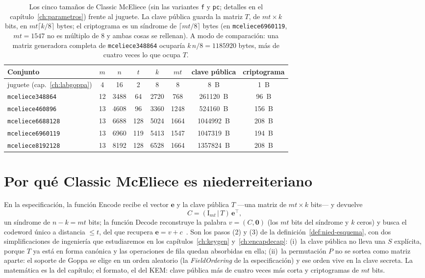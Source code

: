 \documentclass[11pt,a4paper,oneside]{report}
\newcommand{\ve}{\mathbf{e}}
\begin{document}
\begin{table}[htbp]
\centering
\small
\setlength{\tabcolsep}{5pt}
\begin{tabular}{lccccccc}
\toprule
Conjunto & $m$ & $n$ & $t$ & $k$ & $mt$ & clave pública & criptograma\\
\midrule
juguete (cap.~\ref{ch:labgoppa}) & 4 & 16 & 2 & 8 & 8 & 8~B & 1~B\\
\texttt{mceliece348864} & 12 & 3488 & 64 & 2720 & 768 & \num{261120}~B & 96~B\\
\texttt{mceliece460896} & 13 & 4608 & 96 & 3360 & 1248 & \num{524160}~B & 156~B\\
\texttt{mceliece6688128} & 13 & 6688 & 128 & 5024 & 1664 & \num{1044992}~B & 208~B\\
\texttt{mceliece6960119} & 13 & 6960 & 119 & 5413 & 1547 & \num{1047319}~B & 194~B\\
\texttt{mceliece8192128} & 13 & 8192 & 128 & 6528 & 1664 & \num{1357824}~B & 208~B\\
\bottomrule
\end{tabular}
\caption{Los cinco tamaños de Classic McEliece (sin las variantes
\texttt{f} y \texttt{pc}; detalles en el capítulo~\ref{ch:parametros})
frente al juguete. La clave pública guarda la matriz $T$, de
$mt\times k$ bits, en $mt\lceil k/8\rceil$ bytes; el criptograma es un
síndrome de $\lceil mt/8\rceil$ bytes (en \texttt{mceliece6960119},
$mt=1547$ no es múltiplo de $8$ y ambas cosas se rellenan). A modo de
comparación: una matriz generadora completa de \texttt{mceliece348864}
ocuparía $k\,n/8=\num{1185920}$ bytes, más de cuatro veces lo que ocupa
$T$.}
\label{tab:nied-tamanos}
\end{table}

\section{Por qué Classic McEliece es niederreiteriano}

En la especificación, la función \textsf{Encode} recibe el vector $\ve$
y la clave pública $T$ —una matriz de $mt\times k$ bits— y devuelve
\[
  C=(\mathrm{I}_{mt}\,|\,T)\,\ve^{\top},
\]
un síndrome de $n-k=mt$ bits; la función \textsf{Decode} reconstruye la
palabra $v=(C,\mathbf{0})$ (los $mt$ bits del síndrome y $k$ ceros) y
busca el codeword único a distancia $\le t$, del que recupera
$\ve=v+c$~\cite{cmspec}. Son los pasos (2) y (3) de la
definición~\ref{def:nied-esquema}, con dos simplificaciones de
ingeniería que estudiaremos en los capítulos~\ref{ch:keygen}
y~\ref{ch:encapdecap}: (i)~la clave pública no lleva una $S$ explícita,
porque $T$ ya está en forma canónica y las operaciones de fila quedan
absorbidas en ella; (ii)~la permutación $P$ no se sortea como matriz
aparte: el soporte de Goppa se elige en un orden aleatorio (la
\emph{FieldOrdering} de la especificación) y ese orden vive en la clave
secreta. La matemática es la del capítulo; el formato, el del KEM:
clave pública más de cuatro veces más corta y criptogramas de $mt$ bits.
\end{document}

